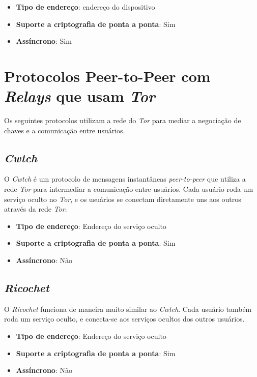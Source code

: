 \begin{itemize}
  \item \textbf{Tipo de endereço}: endereço do dispositivo
  \item \textbf{Suporte a criptografia de ponta a ponta}: Sim
  \item \textbf{Assíncrono}: Sim
\end{itemize}

\section{Protocolos Peer-to-Peer com \textit{Relays} que usam \textit{Tor}}

Os seguintes protocolos utilizam a rede do \textit{Tor} para mediar a negociação de chaves e a comunicação entre usuários.

\subsection{\textit{Cwtch}}

O \textit{Cwtch} é um protocolo de mensagens instantâneas \textit{peer-to-peer} que utiliza a rede \textit{Tor} para intermediar a comunicação entre usuários. Cada usuário roda um serviço oculto no \textit{Tor}, e os usuários se conectam diretamente uns aos outros através da rede \textit{Tor}. \cite{cwtch}

\begin{itemize}
  \item \textbf{Tipo de endereço}: Endereço do serviço oculto
  \item \textbf{Suporte a criptografia de ponta a ponta}: Sim
  \item \textbf{Assíncrono}: Não
\end{itemize}

\subsection{\textit{Ricochet}}

O \textit{Ricochet} funciona de maneira muito similar ao \textit{Cwtch}. Cada usuário também roda um serviço oculto, e conecta-se aos serviços ocultos dos outros usuários. \cite{ricochet}

\begin{itemize}
  \item \textbf{Tipo de endereço}: Endereço do serviço oculto
  \item \textbf{Suporte a criptografia de ponta a ponta}: Sim
  \item \textbf{Assíncrono}: Não
\end{itemize}


